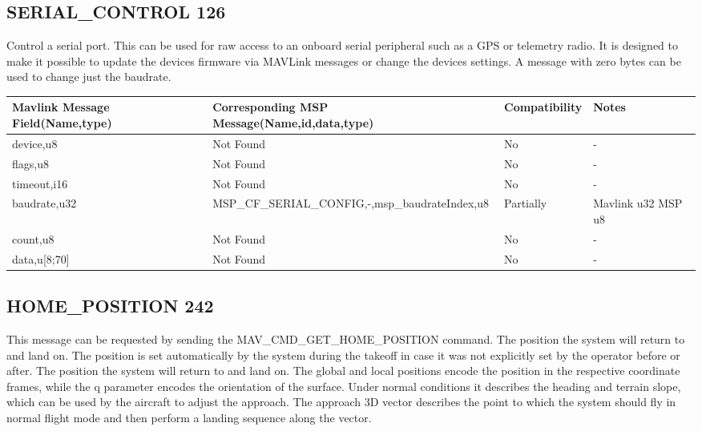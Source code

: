 \cleardoublepage


\subsection{SERIAL\_CONTROL 126 } 
Control a serial port. This can be used for raw access to an onboard serial peripheral such as a GPS or telemetry radio. It is designed to make it possible to update the devices firmware via MAVLink messages or change the devices settings. A message with zero bytes can be used to change just the baudrate.\\

{
\centering
\begin{tabular}{ |p{4cm  } |p{7cm} | p{2cm}|m{5em}|}
\hline
Mavlink Message Field(Name,type)&Corresponding MSP Message(Name,id,data,type)& Compatibility & Notes\\
\hline
device,u8 & Not Found & No & - \\
\hline
flags,u8 & Not Found & No & - \\
\hline
timeout,i16& Not Found & No & - \\
\hline
\rowcolor{lightgray}
baudrate,u32 & MSP\_CF\_SERIAL\_CONFIG,-,msp\_baudrateIndex,u8 & Partially & Mavlink u32 MSP u8 \\
\hline
count,u8 & Not Found & No & - \\
\hline
data,u[8;70] & Not Found & No & - \\
\end{tabular}
}

\cleardoublepage


\subsection{HOME\_POSITION 242 } 
This message can be requested by sending the MAV\_CMD\_GET\_HOME\_POSITION command. The position the system will return to and land on. The position is set automatically by the system during the takeoff in case it was not explicitly set by the operator before or after. The position the system will return to and land on. The global and local positions encode the position in the respective coordinate frames, while the q parameter encodes the orientation of the surface. Under normal conditions it describes the heading and terrain slope, which can be used by the aircraft to adjust the approach. The approach 3D vector describes the point to which the system should fly in normal flight mode and then perform a landing sequence along the vector.\\

